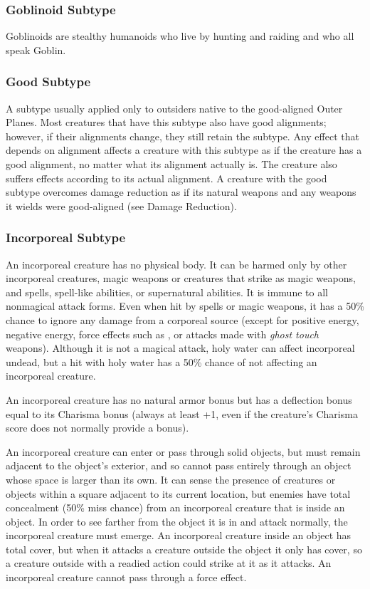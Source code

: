 \subsubsection{Goblinoid Subtype}
Goblinoids are stealthy humanoids who live by hunting and raiding and who all speak Goblin.

\subsubsection{Good Subtype}
A subtype usually applied only to outsiders native to the good-aligned Outer Planes. Most creatures that have this subtype also have good alignments; however, if their alignments change, they still retain the subtype. Any effect that depends on alignment affects a creature with this subtype as if the creature has a good alignment, no matter what its alignment actually is. The creature also suffers effects according to its actual alignment. A creature with the good subtype overcomes damage reduction as if its natural weapons and any weapons it wields were good-aligned (see Damage Reduction).

\subsubsection{Incorporeal Subtype}
An incorporeal creature has no physical body. It can be harmed only by other incorporeal creatures, magic weapons or creatures that strike as magic weapons, and spells, spell-like abilities, or supernatural abilities. It is immune to all nonmagical attack forms. Even when hit by spells or magic weapons, it has a 50\% chance to ignore any damage from a corporeal source (except for positive energy, negative energy, force effects such as , or attacks made with \emph{ghost touch} weapons). Although it is not a magical attack, holy water can affect incorporeal undead, but a hit with holy water has a 50\% chance of not affecting an incorporeal creature.

An incorporeal creature has no natural armor bonus but has a deflection bonus equal to its Charisma bonus (always at least +1, even if the creature's Charisma score does not normally provide a bonus).

An incorporeal creature can enter or pass through solid objects, but must remain adjacent to the object's exterior, and so cannot pass entirely through an object whose space is larger than its own. It can sense the presence of creatures or objects within a square adjacent to its current location, but enemies have total concealment (50\% miss chance) from an incorporeal creature that is inside an object. In order to see farther from the object it is in and attack normally, the incorporeal creature must emerge. An incorporeal creature inside an object has total cover, but when it attacks a creature outside the object it only has cover, so a creature outside with a readied action could strike at it as it attacks. An incorporeal creature cannot pass through a force effect.

